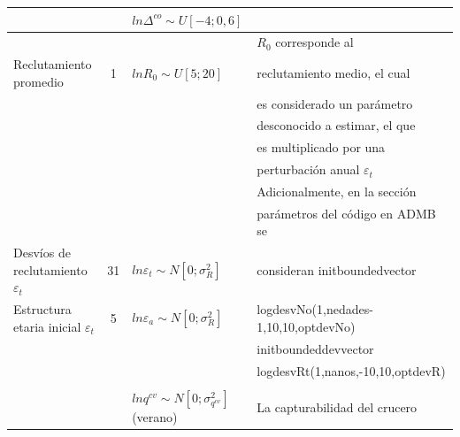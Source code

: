 \documentclass[
  spanish,
]{article}
\begin{document}
\begin{table}[h]
{\begin{tabular}{|l|c|l|l|}
                                          &            & $ln\Delta^{co} \sim U[-4;0,6]$                   & \\ \hline   
                                          &            &                                                  & $R_0$ corresponde al \\
Reclutamiento promedio                    &  1         & $lnR_{0} \sim U[5;20]$                           & reclutamiento medio, el cual\\
                                          &            &                                                  & es considerado un parámetro\\
                                          &            &                                                  & desconocido a estimar, el que\\
                                          &            &                                                  & es multiplicado por una \\
                                          &            &                                                  & perturbación anual $\varepsilon_t$\\
                                          &            &                                                  & Adicionalmente, en la sección \\
                                          &            &                                                  & parámetros del código en ADMB se \\
Desvíos de reclutamiento $\varepsilon_t$  &  31        & $ln \varepsilon_t \sim N[0;\sigma_R^2]$          & consideran initboundedvector \\
Estructura etaria inicial $\varepsilon_t$ &  5         & $ln \varepsilon_a \sim N[0;\sigma_R^2]$          & logdesvNo(1,nedades-1,10,10,optdevNo)\\
                                          &            &                                                  & initboundeddevvector \\
                                          &            &                                                  & logdesvRt(1,nanos,-10,10,optdevR)\\
                                          &            &                                                  & \\\hline
                                          &            & $ln q^{cv} \sim N[0;\sigma_{q^{cv}}^2]$ (verano) &  La capturabilidad del crucero \\

\end{tabular}}
\end{table}
\end{document}
